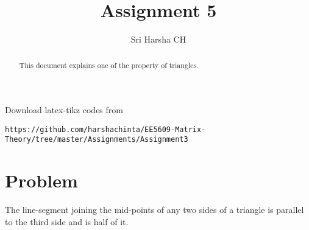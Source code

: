 \documentclass[journal,12pt,twocolumn]{IEEEtran}
\begin{document}
\renewcommand{\thefigure}{\theproblem}

\def\putbox#1#2#3{\makebox[0in][l]{\makebox[#1][l]{}\raisebox{\baselineskip}[0in][0in]{\raisebox{#2}[0in][0in]{#3}}}}
     \def\rightbox#1{\makebox[0in][r]{#1}}
     \def\centbox#1{\makebox[0in]{#1}}
     \def\topbox#1{\raisebox{-\baselineskip}[0in][0in]{#1}}
     \def\midbox#1{\raisebox{-0.5\baselineskip}[0in][0in]{#1}}
\vspace{3cm}
\title{Assignment 5}
\author{Sri Harsha CH}

\maketitle
\newpage

\bigskip
\renewcommand{\thefigure}{\theenumi}
\renewcommand{\thetable}{\theenumi}

\begin{abstract}
This document explains one of the property of triangles.
\end{abstract}
Download latex-tikz codes from 
%
\begin{lstlisting}
https://github.com/harshachinta/EE5609-Matrix-Theory/tree/master/Assignments/Assignment3
\end{lstlisting}
%
\section{Problem}
The line-segment joining the mid-points of any two sides of a triangle is parallel to the third side and is half of it.
\end{document}
